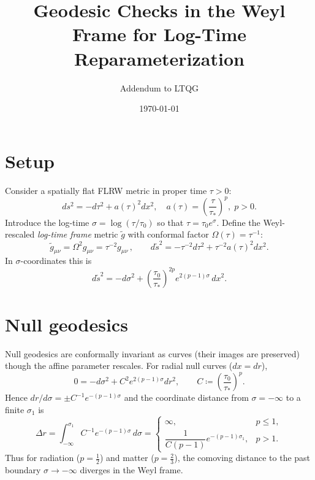 \documentclass[11pt]{article}
\title{Geodesic Checks in the Weyl Frame for Log-Time Reparameterization}
\author{Addendum to LTQG}
\date{\today}
\begin{document}
\maketitle

\section*{Setup}
Consider a spatially flat FLRW metric in proper time $\tau>0$:
\begin{equation}
 ds^2 = -d\tau^2 + a(\tau)^2 d{x}^2,\quad a(\tau)=\left(\frac{\tau}{\tau_*}\right)^p,\; p>0.
\end{equation}
Introduce the log-time $\sigma=\log(\tau/\tau_0)$ so that $\tau=\tau_0 e^\sigma$.
Define the Weyl-rescaled \emph{log-time frame} metric $\tilde g$ with conformal factor $\Omega(\tau)=\tau^{-1}$:
\begin{equation}
 \tilde g_{\mu\nu}=\Omega^2 g_{\mu\nu}=\tau^{-2} g_{\mu\nu}\,,
 \qquad d\tilde s^2 = -\tau^{-2} d\tau^2 + \tau^{-2} a(\tau)^2 d{x}^2 .
\end{equation}
In $\sigma$-coordinates this is
\begin{equation}
 d\tilde s^2 = -d\sigma^2 + \left(\frac{\tau_0}{\tau_*}\right)^{2p} e^{2(p-1)\sigma}\, d{x}^2 .
\end{equation}

\section*{Null geodesics}
Null geodesics are conformally invariant as curves (their images are preserved) though the affine parameter rescales.
For radial null curves ($d{x}=dr$),
\begin{equation}
 0 = -d\sigma^2 + C^2 e^{2(p-1)\sigma} dr^2,\qquad C\coloneqq \left(\frac{\tau_0}{\tau_*}\right)^p .
\end{equation}
Hence $dr/d\sigma = \pm C^{-1} e^{-(p-1)\sigma}$ and the coordinate distance from $\sigma=-\infty$ to a finite $\sigma_1$ is
\begin{equation}
 \Delta r = \int_{-\infty}^{\sigma_1} \!\! C^{-1} e^{-(p-1)\sigma}\, d\sigma = 
 \begin{cases}
  \infty, & p\le 1,\\[4pt]
  \dfrac{1}{C(p-1)} e^{-(p-1)\sigma_1}, & p>1.
 \end{cases}
\end{equation}
Thus for radiation ($p=\tfrac12$) and matter ($p=\tfrac23$), the comoving distance to the past boundary $\sigma\to-\infty$ diverges in the Weyl frame.
\end{document}
